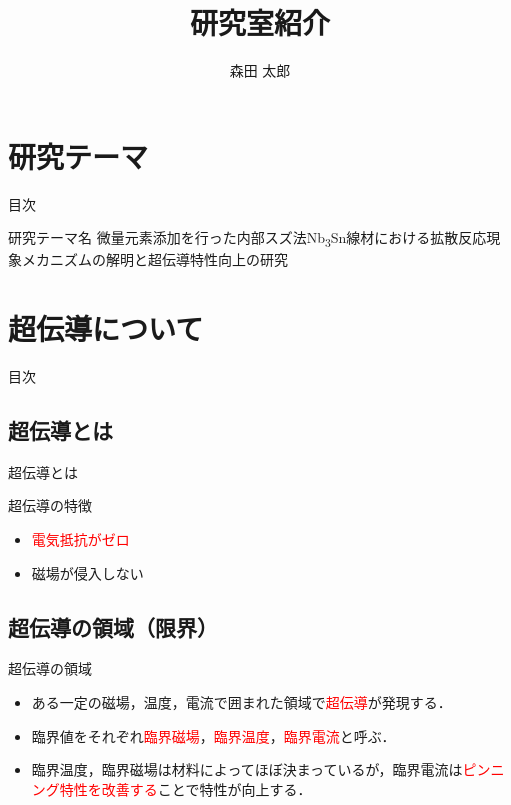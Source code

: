 \documentclass[aspectratio=169, unicode, 10pt]{beamer}
\title{研究室紹介}
\author{森田 太郎}
\institute[Sophia,NIMS]{Sophia University, National Institute for Materials Science}
\begin{document}
	\begin{frame}{}
		\titlepage
	\end{frame}

	\section{研究テーマ}
	\begin{frame}{目次}
	\end{frame}

	\begin{frame}
		\begin{block}{研究テーマ名}
			微量元素添加を行った内部スズ法Nb\textsubscript{3}Sn線材における拡散反応現象メカニズムの解明と超伝導特性向上の研究
		\end{block}
	\end{frame}


	\section{超伝導について}
	\begin{frame}{目次}
	\end{frame}

	\subsection{超伝導とは}
	\begin{frame}{超伝導とは}
		\begin{block}{超伝導の特徴}
			\begin{itemize}
				\item \textcolor{red}{電気抵抗がゼロ}
				\item 磁場が侵入しない
			\end{itemize}
		\end{block}
	\end{frame}

	\subsection{超伝導の領域（限界）}
	\begin{frame}{超伝導の領域}
		\begin{itemize}
			\item ある一定の磁場，温度，電流で囲まれた領域で\textcolor{red}{超伝導}が発現する．
			\item 臨界値をそれぞれ\textcolor{red}{臨界磁場}，\textcolor{red}{臨界温度}，\textcolor{red}{臨界電流}と呼ぶ．
			\item 臨界温度，臨界磁場は材料によってほぼ決まっているが，臨界電流は\textcolor{red}{ピンニング特性を改善する}ことで特性が向上する．
		\end{itemize}
	\end{frame}
\end{document}
